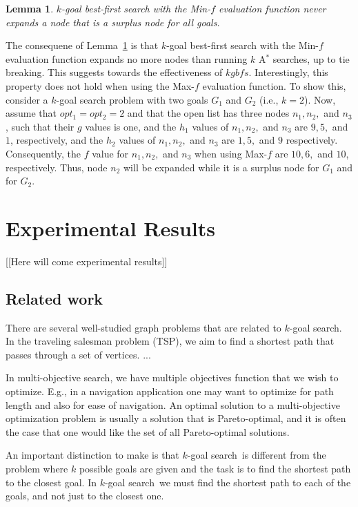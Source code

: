 \documentclass{aicom2e}
\newtheorem{lemma}{Lemma}
\newcommand{\kgs}{$k$-goal search}
\newcommand{\kgbfs}{$k$-goal best-first search}
\newcommand{\astar}{A$^*$}
\begin{document}
\begin{lemma}
\kgbfs{} with the Min-$f$ evaluation function never expands a node
that is a surplus node for all goals. 
\label{lem:min-f-no-surplus}
\end{lemma}
The consequene of Lemma~\ref{lem:min-f-no-surplus} is 
that \kgbfs{} with the Min-$f$ evaluation function expands no more nodes
than running $k$ \astar{} searches, up to tie breaking. This suggests towards the 
effectiveness of $kgbfs{}$. Interestingly, this property does not hold when using
the Max-$f$ evaluation function. To show this, consider a \kgs{} problem with two goals 
$G_1$ and $G_2$ (i.e., $k=2$). Now, assume that $opt_1=opt_2=2$
and that the open list has three nodes $n_1, n_2,$ and $n_3$, such that
their $g$ values is one, and the $h_1$ values of $n_1, n_2,$ and $n_3$
are $9,5,$ and $1$, respectively, and the $h_2$ values of $n_1, n_2,$ and $n_3$ 
are $1,5,$ and $9$ respectively. Consequently, the $f$ value for $n_1, n_2,$ and $n_3$
when using Max-$f$ are $10,6,$ and $10$, respectively. Thus, node $n_2$ will be expanded
while it is a surplus node for $G_1$ and for $G_2$. 





\section{Experimental Results}
[[Here will come experimental results]]

\subsection*{Related work}

There are several well-studied graph problems that are related to $k$-goal search. In the traveling salesman problem (TSP), we aim to find a shortest path that passes through a set of vertices. 
...

In multi-objective search, we have multiple objectives function that we wish to optimize. E.g., in a navigation application one may want to optimize for path length and also for ease of navigation. An optimal 
solution to a multi-objective optimization problem is usually a solution that is Pareto-optimal, and it is often the case that one would like the set of all Pareto-optimal solutions. 


An important distinction to make is that \kgs\ is different from the problem where $k$ possible goals are given and the task is to find the shortest path to the closest goal. In \kgs\ we must find the shortest path to each of the goals, and not just to the closest one. 
\end{document}
